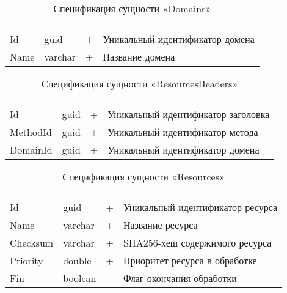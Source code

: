 \begin{xltabular}{\textwidth}{|X|X|X|X|}
	\caption{Спецификация сущности «Domains»}\label{crawler_domains:table}\\ \hline
	 &  &  &  \\ \hline
	 &  &  &  \\ \hline
	\endfirsthead
	 \hline
	 &  &  &  \\ \hline
	\endhead
	Id & guid & + & Уникальный идентификатор домена \\ \hline
	Name & varchar & + & Название домена \\ \hline
\end{xltabular}

\begin{xltabular}{\textwidth}{|X|X|X|X|}
	\caption{Спецификация сущности «ResourcesHeaders»}\label{crawler_resources_headers:table}\\ \hline
	 &  &  &  \\ \hline
	 &  &  &  \\ \hline
	\endfirsthead
	 \hline
	 &  &  &  \\ \hline
	\endhead
	Id & guid & + & Уникальный идентификатор заголовка \\ \hline
	MethodId & guid & + & Уникальный идентификатор метода \\ \hline
	DomainId & guid & + & Уникальный идентификатор домена \\ \hline
\end{xltabular}

\begin{xltabular}{\textwidth}{|X|X|X|X|}
	\caption{Спецификация сущности «Resources»}\label{crawler_resources:table}\\ \hline
	 &  &  &  \\ \hline
	 &  &  &  \\ \hline
	\endfirsthead
	 \hline
	 &  &  &  \\ \hline
	\endhead
	Id & guid & + & Уникальный идентификатор ресурса \\ \hline
	Name & varchar & + & Название ресурса \\ \hline
	Checksum & varchar & + & SHA256-хеш содержимого ресурса \\ \hline
	Priority & double & + & Приоритет ресурса в обработке \\ \hline
	Fin & boolean & - & Флаг окончания обработки \\ \hline
\end{xltabular}

